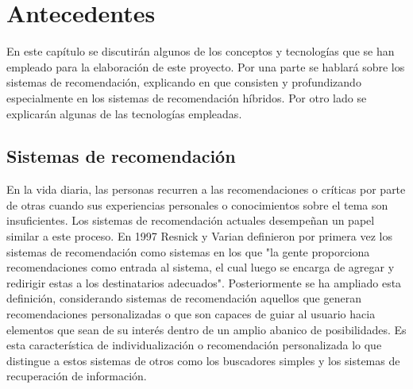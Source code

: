 \chapter{Antecedentes}
\label{chap:antecedentes}

En este capítulo se discutirán algunos de los conceptos y tecnologías que se han empleado para la elaboración de este proyecto. Por una parte se hablará sobre los sistemas de recomendación, explicando en que consisten y profundizando especialmente en los sistemas de recomendación híbridos. Por otro lado se explicarán algunas de las tecnologías empleadas. %

\section{Sistemas de recomendación}
En la vida diaria, las personas recurren a las recomendaciones o críticas por parte de otras cuando sus experiencias personales o conocimientos sobre el tema son insuficientes.  Los sistemas de recomendación actuales desempeñan un papel similar a este proceso. En 1997 Resnick y Varian \cite{Resnick:1997:RS:245108.245121} definieron por primera vez los sistemas de recomendación como sistemas en los que "la gente proporciona recomendaciones como entrada al sistema, el cual luego se encarga de agregar y redirigir estas a los destinatarios adecuados". %
Posteriormente se ha ampliado esta definición, considerando sistemas de recomendación aquellos que generan recomendaciones personalizadas o que son capaces de guiar al usuario hacia elementos que sean de su interés dentro de un amplio abanico de posibilidades. Es esta característica de individualización o recomendación personalizada lo que distingue a estos sistemas de otros como los buscadores simples y los sistemas de recuperación de información.

